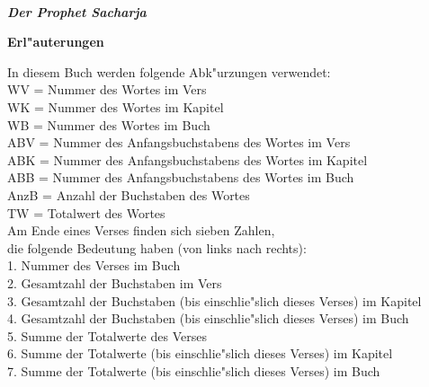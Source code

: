 \documentclass[a4paper,10pt,landscape]{article}
\renewcommand{\sectionmark}[1]{\markright{{#1}}}
\renewcommand{\section}[3]{\begin{center}{ \huge {\bf \textsl{{#1}}\\ \textcolor{red}{\textsl{{#2}}}}}\end{center}
\sectionmark{{#3}}}
\begin{document}

\section{\bigskip\bigskip\bigskip\bigskip\bigskip\bigskip
\\Der Prophet Sacharja}
{}
{Sacharja}	%


\bigskip				%

\newpage
\hphantom{x}
\bigskip\bigskip\bigskip\bigskip\bigskip\bigskip
\begin{center}{ \huge {\bf Erl"auterungen}}\end{center}

\medskip
In diesem Buch werden folgende Abk"urzungen verwendet:\\
WV = Nummer des Wortes im Vers\\
WK = Nummer des Wortes im Kapitel\\
WB = Nummer des Wortes im Buch\\
ABV = Nummer des Anfangsbuchstabens des Wortes im Vers\\
ABK = Nummer des Anfangsbuchstabens des Wortes im Kapitel\\
ABB = Nummer des Anfangsbuchstabens des Wortes im Buch\\
AnzB = Anzahl der Buchstaben des Wortes\\
TW = Totalwert des Wortes\\

\medskip
Am Ende eines Verses finden sich sieben Zahlen,\\
die folgende Bedeutung haben (von links nach rechts):\\
1. Nummer des Verses im Buch\\
2. Gesamtzahl der Buchstaben im Vers\\
3. Gesamtzahl der Buchstaben (bis einschlie"slich dieses Verses) im Kapitel\\
4. Gesamtzahl der Buchstaben (bis einschlie"slich dieses Verses) im Buch\\
5. Summe der Totalwerte des Verses\\
6. Summe der Totalwerte (bis einschlie"slich dieses Verses) im Kapitel\\
7. Summe der Totalwerte (bis einschlie"slich dieses Verses) im Buch\\
\end{document}
